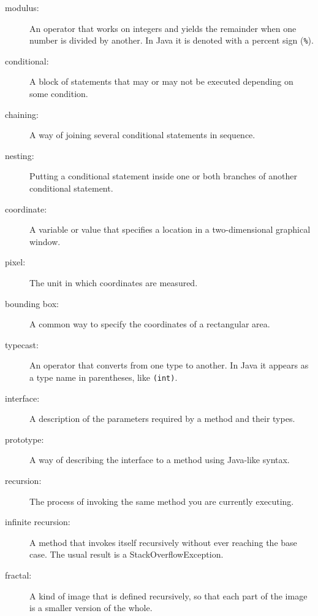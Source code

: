\documentclass{book}
\begin{document}
\begin{description}

\item[modulus:]  An operator that works on integers and yields
the remainder when one number is divided by another.  In Java
it is denoted with a percent sign ({\tt \%}).

\item[conditional:]  A block of statements that may or may not
be executed depending on some condition.

\item[chaining:]  A way of joining several conditional statements
in sequence.

\item[nesting:] Putting a conditional statement inside one or both
branches of another conditional statement.

\item[coordinate:]  A variable or value that specifies a location
in a two-dimensional graphical window.

\item[pixel:]  The unit in which coordinates are measured.

\item[bounding box:]  A common way to specify the coordinates of
a rectangular area.

\item[typecast:]  An operator that converts from one type to another.
In Java it appears as a type name in parentheses, like {\tt (int)}.

\item[interface:]  A description of the parameters required by
a method and their types.

\item[prototype:]  A way of describing the interface to a method
using Java-like syntax.

\item[recursion:]  The process of invoking the same method you
are currently executing.

\item[infinite recursion:]  A method that invokes itself
recursively without ever reaching the base case.  The usual
result is a StackOverflowException.

\item[fractal:]  A kind of image that is defined recursively, so
that each part of the image is a smaller version of the whole.


\end{description}
\end{document}
